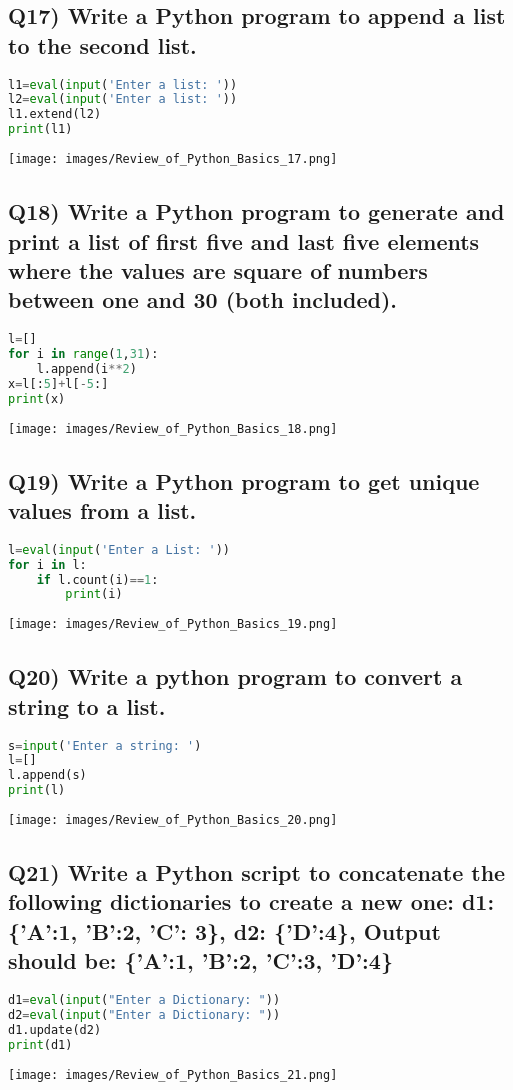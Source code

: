 \documentclass{article}
\begin{document}
\subsection*{Q17) Write a Python program to append a list to the second list.}
\begin{lstlisting}[language=Python]
l1=eval(input('Enter a list: '))
l2=eval(input('Enter a list: '))
l1.extend(l2)
print(l1)
\end{lstlisting}
\texttt{[image: images/Review\_of\_Python\_Basics\_17.png]}

\subsection*{Q18) Write a Python program to generate and print a list of first five and last five elements where the values are square of numbers between one and 30 (both included).}
\begin{lstlisting}[language=Python]
l=[]
for i in range(1,31):
    l.append(i**2)
x=l[:5]+l[-5:]
print(x)
\end{lstlisting}
\texttt{[image: images/Review\_of\_Python\_Basics\_18.png]}

\subsection*{Q19) Write a Python program to get unique values from a list.}
\begin{lstlisting}[language=Python]
l=eval(input('Enter a List: '))
for i in l:
    if l.count(i)==1:
        print(i)
\end{lstlisting}
\texttt{[image: images/Review\_of\_Python\_Basics\_19.png]}

\subsection*{Q20) Write a python program to convert a string to a list.}
\begin{lstlisting}[language=Python]
s=input('Enter a string: ')
l=[]
l.append(s)
print(l)
\end{lstlisting}
\texttt{[image: images/Review\_of\_Python\_Basics\_20.png]}

\subsection*{Q21) Write a Python script to concatenate the following dictionaries to create a new one: d1: \{'A':1, 'B':2, 'C': 3\}, d2: \{'D':4\}, Output should be: \{'A':1, 'B':2, 'C':3, 'D':4\}}
\begin{lstlisting}[language=Python]
d1=eval(input("Enter a Dictionary: "))
d2=eval(input("Enter a Dictionary: "))
d1.update(d2)
print(d1)
\end{lstlisting}
\texttt{[image: images/Review\_of\_Python\_Basics\_21.png]}
\end{document}
